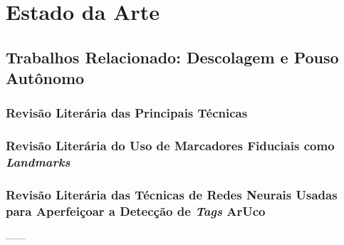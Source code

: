 
\section{Estado da Arte}





\subsection{Trabalhos Relacionado: Descolagem e Pouso Autônomo}

	\subsubsection{Revisão Literária das Principais Técnicas}

	\subsubsection{Revisão Literária do Uso de Marcadores Fiduciais como \textit{Landmarks}}

	\subsubsection{Revisão Literária das Técnicas de Redes Neurais Usadas para Aperfeiçoar a Detecção de \textit{Tags} ArUco}
    
    
    ------
    
